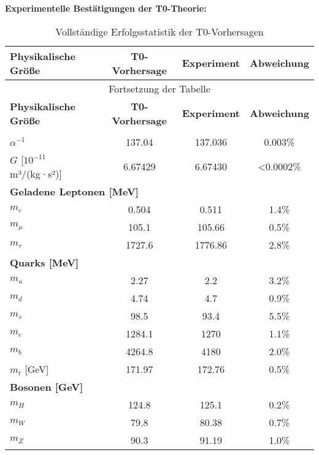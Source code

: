 \documentclass[12pt,a4paper]{article}
\begin{document}
	\begin{achievement}
		\textbf{Experimentelle Bestätigungen der T0-Theorie:}
		
		\begin{center}
			\begin{longtable}{lccc}
				\caption{Vollständige Erfolgsstatistik der T0-Vorhersagen} \\
				\toprule
				\textbf{Physikalische Größe} & \textbf{T0-Vorhersage} & \textbf{Experiment} & \textbf{Abweichung} \\
				\midrule
				\endfirsthead
				\multicolumn{4}{c}{Fortsetzung der Tabelle} \\
				\toprule
				\textbf{Physikalische Größe} & \textbf{T0-Vorhersage} & \textbf{Experiment} & \textbf{Abweichung} \\
				\midrule
				\endhead
				\bottomrule
				\endlastfoot
				
				\multicolumn{4}{l}{\textbf{Fundamentale Konstanten}} \\
				\midrule
				$\alpha^{-1}$ & 137.04 & 137.036 & 0.003\% \\
				$G$ [$10^{-11}$ m³/(kg·s²)] & 6.67429 & 6.67430 & <0.0002\% \\
				\midrule
				
				\multicolumn{4}{l}{\textbf{Geladene Leptonen [MeV]}} \\
				\midrule
				$m_e$ & 0.504 & 0.511 & 1.4\% \\
				$m_\mu$ & 105.1 & 105.66 & 0.5\% \\
				$m_\tau$ & 1727.6 & 1776.86 & 2.8\% \\
				\midrule
				
				\multicolumn{4}{l}{\textbf{Quarks [MeV]}} \\
				\midrule
				$m_u$ & 2.27 & 2.2 & 3.2\% \\
				$m_d$ & 4.74 & 4.7 & 0.9\% \\
				$m_s$ & 98.5 & 93.4 & 5.5\% \\
				$m_c$ & 1284.1 & 1270 & 1.1\% \\
				$m_b$ & 4264.8 & 4180 & 2.0\% \\
				$m_t$ [GeV] & 171.97 & 172.76 & 0.5\% \\
				\midrule
				
				\multicolumn{4}{l}{\textbf{Bosonen [GeV]}} \\
				\midrule
				$m_H$ & 124.8 & 125.1 & 0.2\% \\
				$m_W$ & 79.8 & 80.38 & 0.7\% \\
				$m_Z$ & 90.3 & 91.19 & 1.0\% \\
				\midrule
				

\end{longtable}
\end{center}
\end{achievement}
\end{document}
